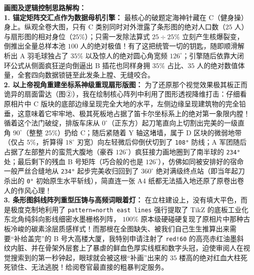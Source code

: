 \vspace{0.4cm}
{\small\color{blue!70!black}
\textbf{画图及逻辑控制思路解构：}\\
\textbf{1. 锚定矩阵交汇点作为数据母机引擎：} 最核心的破题定海神针藏在 C（健身操）身上。纵观全卷大图，只有 C 类别同时对外泄露了条形图的绝对人口数（$25$ 人）与扇形图的相对身位（$25\%$）；只需一发除法算式 $25 \div 25\%$ 立刻产生核爆裂变，倒推出全量总样本池 $100$ 人的绝对极值！有了这把统管一切的钥匙，随即顺滑解析出 A 羽毛球独占了 $35\%$ 以及惊人的绝对圆心角宽频 $126^\circ$；引擎随后依靠大闭环公式从侧面疯狂逆向倒逼出 B 插花也同样身拥 $35\%$ 占比、$35$ 人的绝对数值体量，全套四向数据锁链至此发条上膛、无缝咬合。\\
\textbf{2. 以上帝视角重建坐标系神级重现扇形版图：} 为了还原那个视觉效果极其板正而诡异的扇面雷达（图②），我在绘制核心阵列中利用了图形透视降维打击：仔细看原相片中 C 版块的底部边缘呈现完全大地的水平，左侧边缘呈现建筑物的完全铅垂，这意味着它牢牢地、极其死板地占据了笛卡尔坐标系上的绝对第一象限内膛！\\
循着这个法门破绽，排版车床从 $0^\circ$（正东方）起刀笔直向上切割出完美的一级直角 $90^\circ$（整整 $25\%$）扔给 C；随后紧随着 Y 轴这堵墙，属于 D 区块的微弱地带（仅占 $5\%$，折算得 $18^\circ$ 刃宽）向左轻微后仰倒伏切到了 \texttt{108°} 防线；A 军团随后占据了左部整片的蛮荒大腹地（豪吞 $126^\circ$）疯狂接力画地圈到了南半球的 \texttt{234°} 处；最后剩下的残血 B 号矩阵（巧合般的也是 $126^\circ$），仿佛如同被安排好的宿命一般严丝合缝地从 \texttt{234°} 起步完美收归回到了 $360^\circ$ 绝对满级终点站（即当年起刀杀出的 \texttt{0°} 初始原生水平斩线），简直连一张 A4 纸都无法插入地还原了原卷出卷人的作风心理！\\
\textbf{3. 条形图斜线阵列重型压铸与高频词眼着灯：} 在立柱建设上，没有填大平色，而是极度克制地利用了 \texttt{pattern=north east lines} 强行提取了 TikZ 的底板工业化东北角纯斜向影线细密水墨栅格列阵， $100\%$ 原本级硬碰硬复现了原相片中那种古板冷峻的碳素涂层质感样式！而那根在全图缺失、被我们自己生生推算出来需要“补给盖完”的 B 号大高楼大厦，我特别申请注射了 \texttt{red!60} 的高亮赤红油墨斜纹内脏、并在骨架外层套上了暴虐的鲜血色厚实线框和数字头冠，迫使审阅人在视觉搜索到的第一秒钟起，眼球就会被这根“补画”出来的 $35$ 楼高的绝对红血大柱死死锁住、无法逃脱！给阅卷官最直接的粗暴判定服务。
}

\newpage



\newpage

